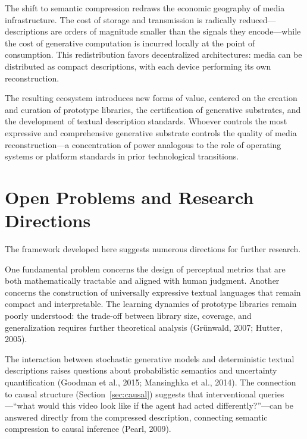 \documentclass[11pt,a4paper]{article}
\theoremstyle{definition}
\theoremstyle{remark}
\begin{document}
The shift to semantic compression redraws the economic geography of media infrastructure. The cost of storage and transmission is radically reduced---descriptions are orders of magnitude smaller than the signals they encode---while the cost of generative computation is incurred locally at the point of consumption. This redistribution favors decentralized architectures: media can be distributed as compact descriptions, with each device performing its own reconstruction.

The resulting ecosystem introduces new forms of value, centered on the creation and curation of prototype libraries, the certification of generative substrates, and the development of textual description standards. Whoever controls the most expressive and comprehensive generative substrate controls the quality of media reconstruction---a concentration of power analogous to the role of operating systems or platform standards in prior technological transitions.

\section{Open Problems and Research Directions}
\label{sec:open_problems}

The framework developed here suggests numerous directions for further research.

One fundamental problem concerns the design of perceptual metrics that are both mathematically tractable and aligned with human judgment. Another concerns the construction of universally expressive textual languages that remain compact and interpretable. The learning dynamics of prototype libraries remain poorly understood: the trade-off between library size, coverage, and generalization requires further theoretical analysis (Gr\"{u}nwald, 2007; Hutter, 2005).

The interaction between stochastic generative models and deterministic textual descriptions raises questions about probabilistic semantics and uncertainty quantification (Goodman et al., 2015; Mansinghka et al., 2014). The connection to causal structure (Section~\ref{sec:causal}) suggests that interventional queries---``what would this video look like if the agent had acted differently?''---can be answered directly from the compressed description, connecting semantic compression to causal inference (Pearl, 2009).
\end{document}

